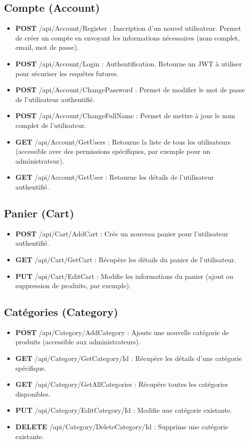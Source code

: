 \subsection*{Compte (Account)}
\begin{itemize}
    \item \textbf{POST} /api/Account/Register : Inscription d'un nouvel utilisateur. Permet de créer un compte en envoyant les informations nécessaires (nom complet, email, mot de passe).
    \item \textbf{POST} /api/Account/Login : Authentification. Retourne un JWT à utiliser pour sécuriser les requêtes futures.
    \item \textbf{POST} /api/Account/ChangePassword : Permet de modifier le mot de passe de l'utilisateur authentifié.
    \item \textbf{POST} /api/Account/ChangeFullName : Permet de mettre à jour le nom complet de l'utilisateur.
    \item \textbf{GET} /api/Account/GetUsers : Retourne la liste de tous les utilisateurs (accessible avec des permissions spécifiques, par exemple pour un administrateur).
    \item \textbf{GET} /api/Account/GetUser : Retourne les détails de l'utilisateur authentifié.
\end{itemize}

\subsection*{Panier (Cart)}
\begin{itemize}
    \item \textbf{POST} /api/Cart/AddCart : Crée un nouveau panier pour l'utilisateur authentifié.
    \item \textbf{GET} /api/Cart/GetCart : Récupère les détails du panier de l'utilisateur.
    \item \textbf{PUT} /api/Cart/EditCart : Modifie les informations du panier (ajout ou suppression de produits, par exemple).
\end{itemize}

\subsection*{Catégories (Category)}
\begin{itemize}
    \item \textbf{POST} /api/Category/AddCategory : Ajoute une nouvelle catégorie de produits (accessible aux administrateurs).
    \item \textbf{GET} /api/Category/GetCategory/{Id} : Récupère les détails d'une catégorie spécifique.
    \item \textbf{GET} /api/Category/GetAllCategories : Récupère toutes les catégories disponibles.
    \item \textbf{PUT} /api/Category/EditCategory/{Id} : Modifie une catégorie existante.
    \item \textbf{DELETE} /api/Category/DeleteCategory/{Id} : Supprime une catégorie existante.
\end{itemize}

